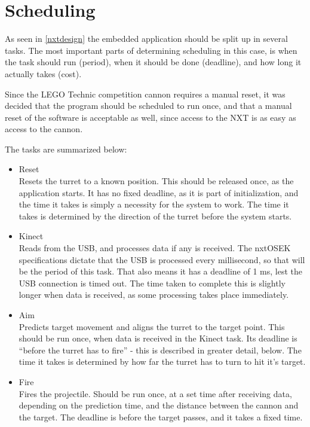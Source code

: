\section{Scheduling}
\label{scheduling}
As seen in \autoref{nxtdesign} the embedded application should be split up in several tasks.
The most important parts of determining scheduling in this case, is when the task should run
(period), when it should be done (deadline), and how long it actually takes (cost).

Since the LEGO Technic competition cannon requires a manual reset, it was decided that
the program should be scheduled to run once, and that a manual reset of the software is
acceptable as well, since access to the NXT is as easy as access to the cannon.

The tasks are summarized below:

\begin{itemize}
  \item{Reset}\\
  Resets the turret to a known position. This should be released once, as the application starts.
  It has no fixed deadline, as it is part of initialization, and the time it takes is
  simply a necessity for the system to work. The time it takes is determined by the direction
  of the turret before the system starts.
  \item{Kinect}\\
  Reads from the USB, and processes data if any is received. The nxtOSEK specifications dictate
  that the USB is processed every millisecond, so that will be the period of this task. That also
  means it has a deadline of 1 ms, lest the USB connection is timed out. The time taken to complete
  this is slightly longer when data is received, as some processing takes place immediately.
  \item{Aim}\\
  Predicts target movement and aligns the turret to the target point. This should be run once,
  when data is received in the Kinect task. Its deadline is ``before the turret has to fire'' - this
  is described in greater detail, below. The time it takes is determined by how far the turret has
  to turn to hit it's target.
  \item{Fire}\\
  Fires the projectile. Should be run once, at a set time after receiving data, depending on the
  prediction time, and the distance between the cannon and the target. The deadline is before 
  the target passes, and it takes a fixed time.
\end{itemize}

